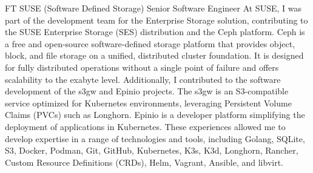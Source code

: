 \documentclass[10pt]{article} %
\begin{document}
\begin{paracol}{2}
{FT} %
{SUSE (Software Defined Storage)} %
{Senior Software Engineer} %
{At SUSE, I was part of the development team for the Enterprise Storage solution, contributing
to the SUSE Enterprise Storage (SES) distribution and the Ceph platform. Ceph is a free and open-source
software-defined storage platform that provides object, block, and file storage on a unified,
distributed cluster foundation. It is designed for fully distributed operations without a single point of
failure and offers scalability to the exabyte level.
Additionally, I contributed to the software development of the s3gw and Epinio projects.
The s3gw is an S3-compatible service optimized for Kubernetes environments, leveraging Persistent Volume
Claims (PVCs) such as Longhorn.
Epinio is a developer platform simplifying the deployment of applications in Kubernetes.
These experiences allowed me to develop expertise in a range of technologies and tools, including
Golang, SQLite, S3, Docker, Podman, Git, GitHub, Kubernetes, K3s, K3d, Longhorn, Rancher,
Custom Resource Definitions (CRDs), Helm, Vagrant, Ansible, and libvirt.} %

\switchcolumn %


\end{paracol}
\end{document}
